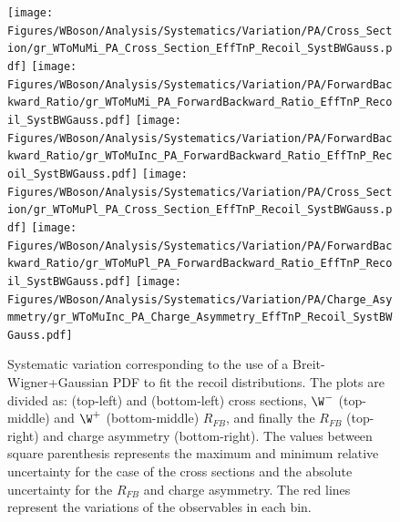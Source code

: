\begin{figure}[!htbp]
 \begin{center}
  \texttt{[image: Figures/WBoson/Analysis/Systematics/Variation/PA/Cross\_Section/gr\_WToMuMi\_PA\_Cross\_Section\_EffTnP\_Recoil\_SystBWGauss.pdf]}
  \texttt{[image: Figures/WBoson/Analysis/Systematics/Variation/PA/ForwardBackward\_Ratio/gr\_WToMuMi\_PA\_ForwardBackward\_Ratio\_EffTnP\_Recoil\_SystBWGauss.pdf]}
  \texttt{[image: Figures/WBoson/Analysis/Systematics/Variation/PA/ForwardBackward\_Ratio/gr\_WToMuInc\_PA\_ForwardBackward\_Ratio\_EffTnP\_Recoil\_SystBWGauss.pdf]}
  \texttt{[image: Figures/WBoson/Analysis/Systematics/Variation/PA/Cross\_Section/gr\_WToMuPl\_PA\_Cross\_Section\_EffTnP\_Recoil\_SystBWGauss.pdf]}
  \texttt{[image: Figures/WBoson/Analysis/Systematics/Variation/PA/ForwardBackward\_Ratio/gr\_WToMuPl\_PA\_ForwardBackward\_Ratio\_EffTnP\_Recoil\_SystBWGauss.pdf]}
  \texttt{[image: Figures/WBoson/Analysis/Systematics/Variation/PA/Charge\_Asymmetry/gr\_WToMuInc\_PA\_Charge\_Asymmetry\_EffTnP\_Recoil\_SystBWGauss.pdf]}
 \end{center}
 \caption{Systematic variation corresponding to the use of a Breit-Wigner+Gaussian PDF to fit the recoil distributions. The plots are divided as: \WToMuNuMi (top-left) and \WToMuNuPl (bottom-left) cross sections, $\W^{-}$ (top-middle) and $\W^{+}$ (bottom-middle) $R_{FB}$, and finally the \W $R_{FB}$ (top-right) and \W charge asymmetry (bottom-right). The values between square parenthesis represents the maximum and minimum relative uncertainty for the case of the cross sections and the absolute uncertainty for the $R_{FB}$ and charge asymmetry. The red lines represent the variations of the observables in each bin.}
 \label{fig:Recoil_SystBWGauss}
\end{figure}

